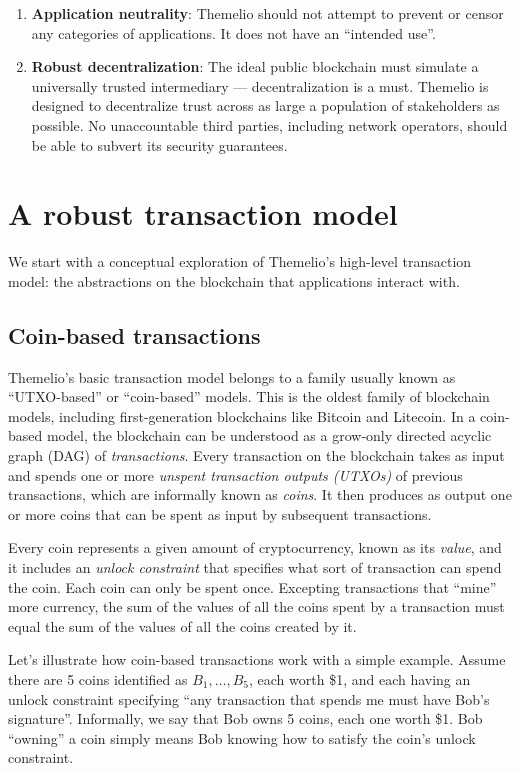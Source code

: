 \documentclass[headinclude]{scrbook}
\begin{document}
\begin{enumerate}
    \item \textbf{Application neutrality}: Themelio should not attempt to prevent or censor any categories of applications. It does not have an ``intended use''.
    \item \textbf{Robust decentralization}: The ideal public blockchain must simulate a universally trusted intermediary --- decentralization is a must. Themelio is designed to decentralize trust across as large a population of stakeholders as possible. No unaccountable third parties, including network operators, should be able to subvert its security guarantees.
\end{enumerate}

\section{A robust transaction model}

We start with a conceptual exploration of Themelio's high-level transaction model: the abstractions on the blockchain that applications interact with.

\subsection{Coin-based transactions}

Themelio's basic transaction model belongs to a family usually known as ``UTXO-based'' or ``coin-based'' models. This is the oldest family of blockchain models, including first-generation blockchains like Bitcoin and Litecoin. In a coin-based model, the blockchain can be understood as a grow-only directed acyclic graph (DAG) of \emph{transactions}. Every transaction on the blockchain takes as input and spends one or more \emph{unspent transaction outputs (UTXOs)} of previous transactions, which are informally known as \textit{coins}. It then produces as output one or more coins that can be spent as input by subsequent transactions.

Every coin represents a given amount of cryptocurrency, known as its \emph{value}, and it includes an \emph{unlock constraint} that specifies what sort of transaction can spend the coin. Each coin can only be spent once. Excepting transactions that ``mine'' more currency, the sum of the values of all the coins spent by a transaction must equal the sum of the values of all the coins created by it.

Let's illustrate how coin-based transactions work with a simple example. Assume there are 5 coins identified as $B_1,\dots,B_{5}$, each worth \$1, and each having an unlock constraint specifying ``any transaction that spends me must have Bob's signature''. Informally, we say that Bob owns 5 coins, each one worth \$1. Bob ``owning'' a coin simply means Bob knowing how to satisfy the coin's unlock constraint.
\end{document}
